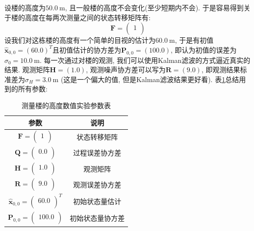 \documentclass[12pt]{article}
\begin{document}
设楼的高度为$50.0 \ \mathrm{m}$, 且一般楼的高度不会变化(至少短期内不会). 于是容易得到关于楼的高度在每两次测量之间的状态转移矩阵有: 
\begin{equation*}
\bm{F} =    
\begin{pmatrix} %
      1 \\
\end{pmatrix}
\end{equation*}
设我们对这栋楼的高度有一个简单的目视的估计为$60.0 \ \mathrm{m}$, 于是有初值$\hat{\bm{x}}_{0,0} = (60.0)^T$且初值估计的协方差为$\bm{P}_{0,0} = (100.0)$, 即认为初值的误差为$\sigma_0 = 10.0 \ \mathrm{m}$. 每一次通过对楼的观测, 我们可以使用Kalman滤波的方式逼近真实的结果. 观测矩阵$\bm{H} = (1.0)$, 观测噪声协方差可以写为$\bm{R} = (9.0)$, 即观测结果标准差为$\sigma_H = 3.0 \ \mathrm{m}$ (这是一个偏大的值, 但是Kalman滤波结果更好看).
表\ref{tab:experimaent_1_parameters}总结用到的所有参数:
\begin{table}[H]
\centering
\caption{测量楼的高度数值实验参数表}
\label{tab:experimaent_1_parameters}
\begin{tabular}{cc} 
\hline 			
参数 & 说明  \\  
\hline 
$\bm{F} =    
\begin{pmatrix} %
      1 \\
\end{pmatrix}$ & 状态转移矩阵 \\ 
$\bm{Q} = \begin{pmatrix} %
      0.0 \\
\end{pmatrix}$ & 过程误差协方差 \\
$\bm{H} = \begin{pmatrix} %
      1.0 \\
\end{pmatrix}$ & 观测矩阵 \\
$\bm{R} = \begin{pmatrix} %
      9.0 \\
\end{pmatrix}$ & 观测误差协方差 \\
$\hat{\bm{x}}_{0,0} = \begin{pmatrix} %
      60.0 \\
\end{pmatrix}^T$ & 初始状态量估计 \\
$\bm{P}_{0,0} = \begin{pmatrix} %
      100.0 \\
\end{pmatrix}$ & 初始状态量协方差 \\
\hline 
\end{tabular}
\end{table}
\end{document}
